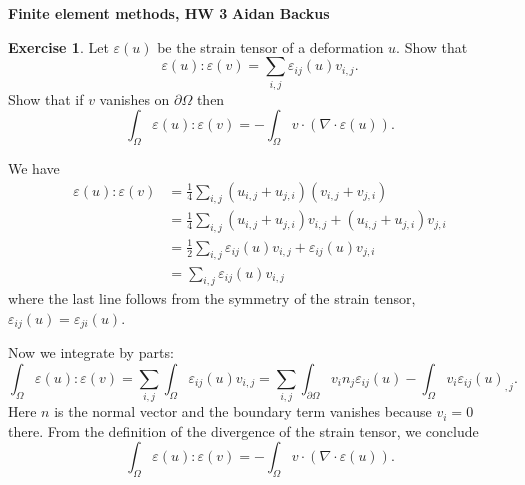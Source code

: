 \documentclass[10pt]{article}
\theoremstyle{definition}
\newtheorem{exer}{Exercise}
\begin{document}
\noindent
\large\textbf{Finite element methods, HW 3} \hfill \textbf{Aidan Backus} \\

\begin{exer}
Let $\varepsilon(u)$ be the strain tensor of a deformation $u$.
Show that
$$\varepsilon(u):\varepsilon(v) = \sum_{i,j} \varepsilon_{ij}(u) v_{i,j}.$$
Show that if $v$ vanishes on $\partial \Omega$ then
$$\int_\Omega \varepsilon(u):\varepsilon(v) = -\int_\Omega v \cdot (\nabla \cdot \varepsilon(u)).$$
\end{exer}

We have
\begin{align*}
\varepsilon(u):\varepsilon(v) &= \frac{1}{4} \sum_{i,j} (u_{i,j} + u_{j,i})(v_{i, j} + v_{j, i}) \\
&= \frac{1}{4} \sum_{i,j} (u_{i,j} + u_{j,i})v_{i,j} + (u_{i,j} + u_{j,i})v_{j,i}\\
&= \frac{1}{2} \sum_{i,j} \varepsilon_{ij}(u) v_{i, j} + \varepsilon_{ij}(u) v_{j,i} \\
&= \sum_{i,j} \varepsilon_{ij}(u) v_{i,j}
\end{align*}
where the last line follows from the symmetry of the strain tensor, $\varepsilon_{ij}(u) = \varepsilon_{ji}(u)$.

Now we integrate by parts:
$$\int_\Omega \varepsilon(u):\varepsilon(v) = \sum_{i,j} \int_\Omega \varepsilon_{ij}(u) v_{i,j} = \sum_{i,j} \int_{\partial \Omega} v_i n_j \varepsilon_{ij}(u) - \int_\Omega v_i \varepsilon_{ij}(u)_{,j}.$$
Here $n$ is the normal vector and the boundary term vanishes because $v_i = 0$ there.
From the definition of the divergence of the strain tensor, we conclude
$$\int_\Omega \varepsilon(u):\varepsilon(v) = -\int_\Omega v \cdot (\nabla \cdot \varepsilon(u)).$$
\end{document}
